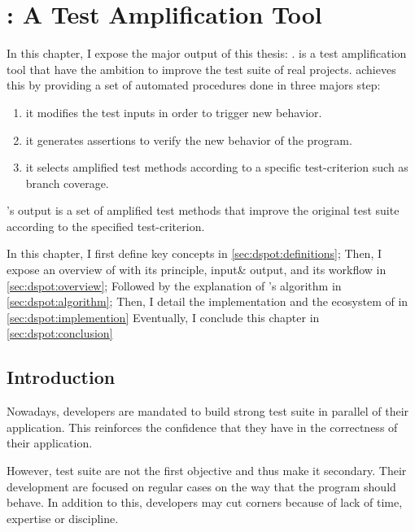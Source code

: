\chapter{\dspot: A Test Amplification Tool}
\label{chap:dspot}

\begin{chaptersummary}
		In this chapter, I expose the major output of this thesis: \dspot.
		\dspot is a test amplification tool that have the ambition to improve the test suite of real projects.
		\dspot achieves this by providing a set of automated procedures done in three majors step:
		\begin{enumerate}
			\item it modifies the test inputs in order to trigger new behavior.
			\item it generates assertions to verify the new behavior of the program.
			\item it selects amplified test methods according to a specific test-criterion such as branch coverage.
		\end{enumerate}
	
		\dspot's output is a set of amplified test methods that improve the original test suite according to the specified test-criterion.
		
		In this chapter, I first define key concepts in \autoref{sec:dspot:definitions};
		Then, I expose an overview of \dspot with its principle, input\& output, and its workflow in \autoref{sec:dspot:overview};
		Followed by the explanation of \dspot's algorithm in \autoref{sec:dspot:algorithm};
		Then, I detail the implementation and the ecosystem of \dspot in \autoref{sec:dspot:implemention}
		Eventually, I conclude this chapter in \autoref{sec:dspot:conclusion}
\end{chaptersummary}

\minitoc

\graphicspath{{.}{chapitres/dspot/}}

\section{Introduction}
\label{sec:dspot:introduction}

Nowadays, developers are mandated to build strong test suite in parallel of their application.
This reinforces the confidence that they have in the correctness of their application.

However, test suite are not the first objective and thus make it secondary.
Their development are focused on regular cases on the way that the program should behave.
In addition to this, developers may cut corners because of lack of time, expertise or discipline.

